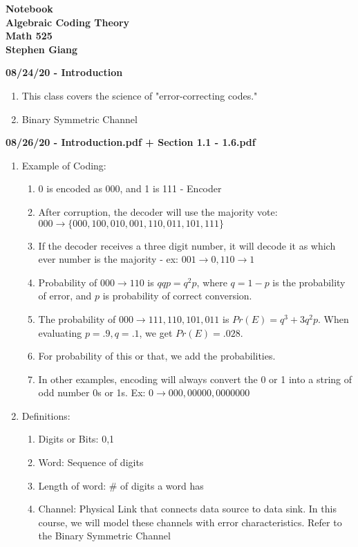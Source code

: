 \documentclass[11pt]{article}
\newcommand{\skipline}{\vspace{\baselineskip}}
\begin{document}
	
	\begin{center}
		\textbf{Notebook} \\
		\textbf{Algebraic Coding Theory} \\
		\textbf{Math 525} \\
		\textbf{Stephen Giang} \\
	\end{center}
	
	\textbf{08/24/20 - Introduction}
	\begin{enumerate}
		\item This class covers the science of "error-correcting codes." 
		\item Binary Symmetric Channel
	\end{enumerate}
	\skipline
	\textbf{08/26/20 - Introduction.pdf + Section 1.1 - 1.6.pdf}
	\begin{enumerate}
		\item Example of Coding:
			\begin{enumerate}
				\item 0 is encoded as 000, and 1 is 111 - Encoder
				\item After corruption, the decoder will use the majority vote:
				$000 \rightarrow \{000,100,010,001,110,011,101,111\}$ 
				\item If the decoder receives a three digit number, it will decode it as which ever number is the majority - ex: $001 \rightarrow 0, 110 \rightarrow 1$
				\item Probability of $000 \rightarrow 110$ is $qqp = q^2p$, where $q = 1 - p$ is the probability of error, and $p$ is probability of correct conversion.
				\item The probability of $000 \rightarrow 111, 110, 101, 011$ is $Pr(E) = q^3 + 3q^2p$.  When evaluating $p = .9, q = .1$, we get $Pr(E) = .028$. 
				\item For probability of this or that, we add the probabilities. 
				\item In other examples, encoding will always convert the 0 or 1 into a string of odd number 0s or 1s. Ex: $0 \rightarrow 000, 00000, 0000000$
			\end{enumerate}
		\item Definitions:
			\begin{enumerate}
				\item Digits or Bits: 0,1 
				\item Word: Sequence of digits
				\item Length of word: \# of digits a word has
				\item Channel: Physical Link that connects data source to data sink.  In this course, we will model these channels with error characteristics.  Refer to the Binary Symmetric Channel

\end{enumerate}
\end{enumerate}
\end{document}
